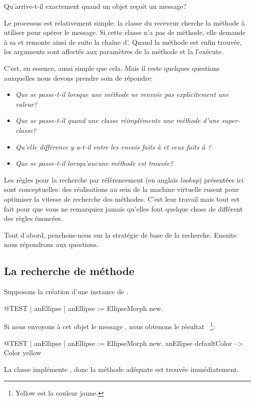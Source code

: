 \documentclass[a4paper,10pt,twoside]{book}
\begin{document}

Qu'arrive-t-il exactement quand un objet reçoit un message?

Le processus est relativement simple:
la classe du receveur cherche la méthode à utiliser pour opérer le message.
Si cette classe n'a pas de méthode, elle demande à sa  et remonte ainsi de suite la chaîne d'.
Quand la méthode est enfin trouvée, les arguments sont affectés aux paramètres de la méthode et la  l'exécute.

C'est, en essence, aussi simple que cela.
Mais il reste quelques questions auxquelles nous devons prendre soin de répondre:

\begin{itemize}
  \item \emph{Que se passe-t-il lorsque une méthode ne renvoie pas explicitement une valeur?}
  \item \emph{Que se passe-t-il quand une classe réimplémente une méthode d'une super-classe?}
  \item \emph{Qu'elle différence y a-t-il entre les envois faits à  et ceux faits à ?}
  \item \emph{Que se passe-t-il lorsqu'aucune méthode est trouvée?}
\end{itemize}

Les règles pour la recherche par référencement (en anglais \emph{lookup}) présentées ici sont conceptuelles: des réalisations au sein de la machine virtuelle rusent pour optimiser la vitesse de recherche des méthodes. 
C'est leur travail mais tout est fait pour que vous ne remarquiez jamais qu'elles font quelque chose de différent des règles énoncées.

Tout d'abord, penchons-nous sur la stratégie de base de la recherche. Ensuite nous répondrons aux questions.

\subsection{La recherche de méthode}
Supposons la création d'une instance de .
\begin{code}{@TEST | anEllipse |}
anEllipse := EllipseMorph new.
\end{code}
\noindent
Si nous envoyons à cet objet le message , nous obtenons le résultat ~\footnote{Yellow est la couleur jaune.}:
\begin{code}{@TEST | anEllipse | anEllipse := EllipseMorph new.}
anEllipse defaultColor --> Color yellow
\end{code}
\noindent
La classe  implémente , donc la méthode adéquate est trouvée immédiatement.
\end{document}

